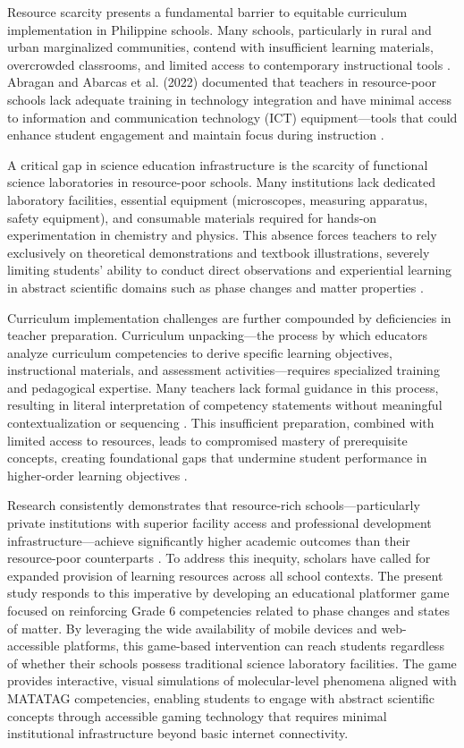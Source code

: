 Resource scarcity presents a fundamental barrier to equitable curriculum implementation in Philippine schools. Many schools, particularly in rural and urban marginalized communities, contend with insufficient learning materials, overcrowded classrooms, and limited access to contemporary instructional tools \cite{Kilag2024}. Abragan and Abarcas et al. (2022) documented that teachers in resource-poor schools lack adequate training in technology integration and have minimal access to information and communication technology (ICT) equipment---tools that could enhance student engagement and maintain focus during instruction \cite{Abragan2022}.

A critical gap in science education infrastructure is the scarcity of functional science laboratories in resource-poor schools. Many institutions lack dedicated laboratory facilities, essential equipment (microscopes, measuring apparatus, safety equipment), and consumable materials required for hands-on experimentation in chemistry and physics. This absence forces teachers to rely exclusively on theoretical demonstrations and textbook illustrations, severely limiting students' ability to conduct direct observations and experiential learning in abstract scientific domains such as phase changes and matter properties \cite{Kilag2024}.

Curriculum implementation challenges are further compounded by deficiencies in teacher preparation. Curriculum unpacking---the process by which educators analyze curriculum competencies to derive specific learning objectives, instructional materials, and assessment activities---requires specialized training and pedagogical expertise. Many teachers lack formal guidance in this process, resulting in literal interpretation of competency statements without meaningful contextualization or sequencing \cite{Gallego2024}. This insufficient preparation, combined with limited access to resources, leads to compromised mastery of prerequisite concepts, creating foundational gaps that undermine student performance in higher-order learning objectives \cite{Gabriel2022}.

Research consistently demonstrates that resource-rich schools---particularly private institutions with superior facility access and professional development infrastructure---achieve significantly higher academic outcomes than their resource-poor counterparts \cite{Angay2023}. To address this inequity, scholars have called for expanded provision of learning resources across all school contexts. The present study responds to this imperative by developing an educational platformer game focused on reinforcing Grade 6 competencies related to phase changes and states of matter. By leveraging the wide availability of mobile devices and web-accessible platforms, this game-based intervention can reach students regardless of whether their schools possess traditional science laboratory facilities. The game provides interactive, visual simulations of molecular-level phenomena aligned with MATATAG competencies, enabling students to engage with abstract scientific concepts through accessible gaming technology that requires minimal institutional infrastructure beyond basic internet connectivity.

